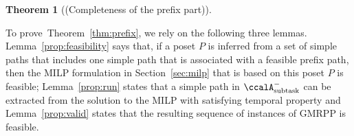 \documentclass[Afour,sageh,times]{sagej}
\makeatletter
\newtheorem{thm}{Theorem}[section]
\newtheorem{cor}[thm]{Corollary}
\newcommand{\ltl}{ {\it LTL}$_{-\bigcirc}$ }
\newcommand{\auto}[1]{\ccalA_{\textup{#1}}}
\newcommand{\autop}{\ccalA_{\phi}}
\newcommand{\vertex}[1]{v_{\textup{#1}}}
\newcommand{\scriptveryshortarrow}[1][3pt]{{%
    \hbox{\rule[\scriptratio\dimexpr\fontdimen22\textfont2-.2pt\relax]
               {\scriptratio\dimexpr#1\relax}{\scriptratio\dimexpr.4pt\relax}}%
   \mkern-4mu\hbox{\let\f@size\sf@size\usefont{U}{lasy}{m}{n}\symbol{41}}}}
\makeatother
\begin{document}
{{\begin{thm}[(Completeness of the prefix part)]
\end{thm}

To prove~Theorem~\ref{thm:prefix}, we rely on the following three lemmas.
Lemma~\ref{prop:feasibility} says that, if a poset $P$ is inferred from a set of simple paths that includes  one simple path that is associated with a feasible prefix path, then the MILP formulation in Section~\ref{sec:milp} that is based on this poset $P$ is feasible; Lemma~\ref{prop:run} states that a simple path in $\auto{subtask}^-$ can be extracted from the solution to the MILP with satisfying temporal property and Lemma~\ref{prop:valid} states that the resulting sequence of instances of GMRPP is feasible.

}}
\end{document}
